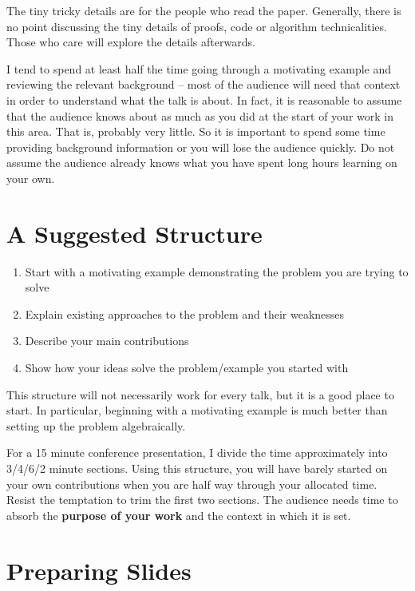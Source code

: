 \documentclass[
]{book}
\providecommand{\tightlist}{%
  \setlength{\itemsep}{0pt}\setlength{\parskip}{0pt}}
\begin{document}
The tiny tricky details are for the people who read
the paper. Generally, there is no point discussing the
tiny details of proofs, code or algorithm technicalities. Those
who care will explore the details afterwards.

I tend to spend at least half the time going
through a motivating example and reviewing the
relevant background -- most of the audience will
need that context in order to understand what the
talk is about. In fact, it is reasonable to assume that
the audience knows about as much as you did at the
start of your work in this area. That is, probably very
little. So it is important to spend some time providing
background information or you will lose the audience
quickly. Do not assume the audience already knows what you have spent long hours learning on
your own.

\hypertarget{a-suggested-structure}{%
\section{A Suggested Structure}\label{a-suggested-structure}}

\begin{enumerate}
\def\labelenumi{\arabic{enumi}.}
\tightlist
\item
  Start with a motivating example demonstrating the problem you are trying to solve
\item
  Explain existing approaches to the problem and their weaknesses
\item
  Describe your main contributions
\item
  Show how your ideas solve the problem/example you started with
\end{enumerate}

This structure will not necessarily work for every
talk, but it is a good place to start. In particular, beginning
with a motivating example is much better
than setting up the problem algebraically.

For a 15 minute conference presentation, I divide
the time approximately into 3/4/6/2 minute sections.
Using this structure, you will have barely started
on your own contributions when you are half way
through your allocated time. Resist the temptation to
trim the first two sections. The audience needs time
to absorb the \textbf{purpose of your work} and the context
in which it is set.

\hypertarget{preparing-slides}{%
\section{Preparing Slides}\label{preparing-slides}}
\end{document}
